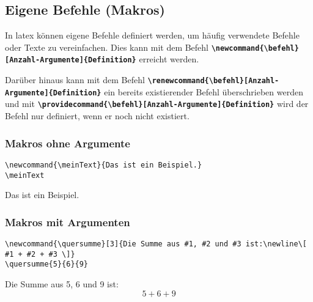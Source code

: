 \subsection{Eigene Befehle (Makros)}
In latex können eigene Befehle definiert werden, um häufig verwendete Befehle oder Texte zu vereinfachen. Dies kann mit dem Befehl \textbf{\texttt{\textbackslash newcommand\{\textbackslash befehl\}[Anzahl-Argumente]\{Definition\}}} erreicht werden.

Darüber hinaus kann mit dem Befehl \textbf{\texttt{\textbackslash renewcommand\{\textbackslash befehl\}[Anzahl-Argumente]\{Definition\}}} ein bereits existierender Befehl überschrieben werden und mit \newline \textbf{\texttt{\textbackslash providecommand\{\textbackslash befehl\}[Anzahl-Argumente]\{Definition\}}} wird der Befehl nur definiert, wenn er noch nicht existiert.

\subsubsection{Makros ohne Argumente}

\begin{minipage}[c]{0.65\textwidth}
    \begin{lstlisting}[language={[LaTeX]TeX}]
\newcommand{\meinText}{Das ist ein Beispiel.}
\meinText
        \end{lstlisting}
\end{minipage}
\hfill
\begin{minipage}[c]{0.3\textwidth}
    \newcommand{\meinText}{Das ist ein Beispiel.}
    \meinText
\end{minipage}

\subsubsection{Makros mit Argumenten}

\begin{minipage}[c]{0.65\textwidth}
    \begin{lstlisting}[language={[LaTeX]TeX}]
\newcommand{\quersumme}[3]{Die Summe aus #1, #2 und #3 ist:\newline\[ #1 + #2 + #3 \]}
\quersumme{5}{6}{9}
        \end{lstlisting}
\end{minipage}
\hfill
\begin{minipage}[c]{0.3\textwidth}
    \newcommand{\quersumme}[3]{Die Summe aus #1, #2 und #3 ist:\newline\[ #1 + #2 + #3 \]}
    \quersumme{5}{6}{9}
\end{minipage}